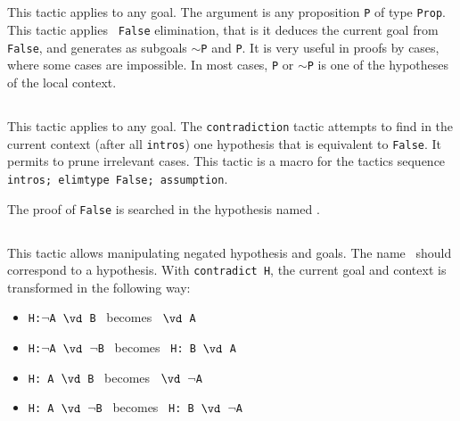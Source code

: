 \subsection{}
\label{absurd}

This tactic applies to any goal. The argument {\term} is any
proposition {\tt P} of type {\tt Prop}. This tactic applies {\tt
  False} elimination, that is it deduces the current goal from {\tt
  False}, and generates as subgoals {\tt $\sim$P} and {\tt P}. It is
very useful in proofs by cases, where some cases are impossible. In
most cases, \texttt{P} or $\sim$\texttt{P} is one of the hypotheses of
the local context.

\subsection{}
\label{contradiction}

This tactic applies to any goal. The {\tt contradiction} tactic
attempts to find in the current context (after all {\tt intros}) one
hypothesis that is equivalent to {\tt False}. It permits to prune
irrelevant cases. This tactic is a macro for the tactics sequence
{\tt intros; elimtype False; assumption}.

\begin{ErrMsgs}
\item {}
\end{ErrMsgs}

\begin{Variants}
\item {}

The proof of {\tt False} is searched in the hypothesis named \ident.
\end{Variants}

\subsection{}
\label{contradict}

This tactic allows manipulating negated hypothesis and goals. The
name \ident\ should correspond to a hypothesis. With
{\tt contradict H}, the current goal and context is transformed in
the following way:
\begin{itemize}
\item  {\tt H:$\neg$A $\vd$  B} \ becomes \ {\tt $\vd$ A}
\item  {\tt H:$\neg$A $\vd$ $\neg$B} \  becomes \ {\tt H: B $\vd$  A }
\item  {\tt H: A $\vd$  B} \ becomes \ {\tt $\vd$ $\neg$A}
\item  {\tt H: A $\vd$ $\neg$B} \ becomes \ {\tt H: B $\vd$ $\neg$A}
\end{itemize}

